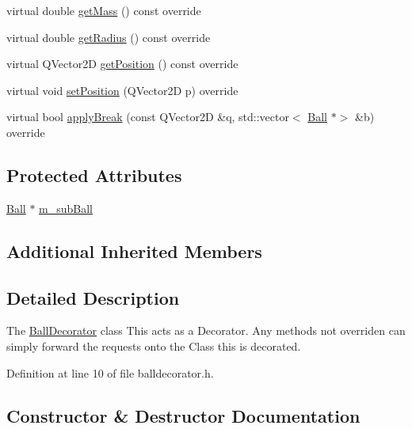 \begin{DoxyCompactItemize}
virtual double \mbox{\hyperlink{class_ball_decorator_acf6892e513f9dc01bb6f87028e8ca9d5}{get\+Mass}} () const override
\item 
virtual double \mbox{\hyperlink{class_ball_decorator_af842f5b568d3baa21fd68bb4ede7068a}{get\+Radius}} () const override
\item 
virtual Q\+Vector2D \mbox{\hyperlink{class_ball_decorator_a40b5df839e4f1aaec4ee792749757848}{get\+Position}} () const override
\item 
virtual void \mbox{\hyperlink{class_ball_decorator_aad7c3ecc4449881048f8610ecc73ec31}{set\+Position}} (Q\+Vector2D p) override
\item 
virtual bool \mbox{\hyperlink{class_ball_decorator_a6c11bb4c2a4accb0167a71c8a5cc5ea7}{apply\+Break}} (const Q\+Vector2D \&q, std\+::vector$<$ \mbox{\hyperlink{class_ball}{Ball}} $\ast$$>$ \&b) override
\end{DoxyCompactItemize}
\subsection*{Protected Attributes}
\begin{DoxyCompactItemize}
\item 
\mbox{\hyperlink{class_ball}{Ball}} $\ast$ \mbox{\hyperlink{class_ball_decorator_ab002bec02e2638a0c600c467f51e27f3}{m\+\_\+sub\+Ball}}
\end{DoxyCompactItemize}
\subsection*{Additional Inherited Members}


\subsection{Detailed Description}
The \mbox{\hyperlink{class_ball_decorator}{Ball\+Decorator}} class This acts as a Decorator. Any methods not overriden can simply forward the requests onto the Class this is decorated. 

Definition at line 10 of file balldecorator.\+h.



\subsection{Constructor \& Destructor Documentation}
\mbox{\label{class_ball_decorator_a8ba466927a1d9eb97ee0094a11b5596c}} 
